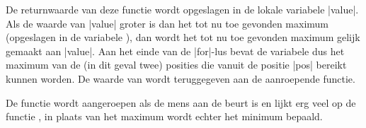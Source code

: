\begin{cpplstShortInline}
De returnwaarde van deze functie wordt opgeslagen in de lokale variabele |value|.
Als de waarde van |value| groter is dan het tot nu toe gevonden maximum (opgeslagen in de variabele ), dan wordt het tot nu toe gevonden maximum gelijk gemaakt aan |value|.
Aan het einde van de |for|\hyp{}lus bevat de variabele  dus het maximum van de (in dit geval twee) posities die vanuit de positie |pos| bereikt kunnen worden.
De waarde van  wordt teruggegeven aan de aanroepende functie.

De functie  wordt aangeroepen als de mens aan de beurt is en lijkt erg veel op de functie , in plaats van het maximum wordt echter het minimum bepaald.


\end{cpplstShortInline}
